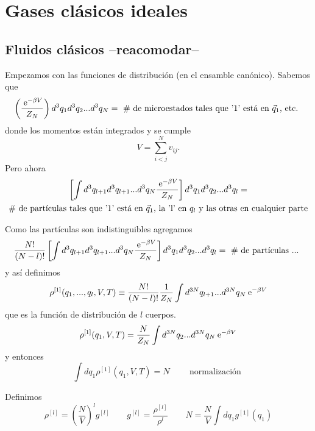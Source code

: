 \documentclass[10pt,oneside]{CBFT_book}
\begin{document}
\chapter{Gases clásicos ideales}


\section{Fluidos clásicos --reacomodar--}

Empezamos con las funciones de distribución (en el ensamble canónico). Sabemos que
\[
	\left( \frac{\:\mathrm{e}^{-\beta V}}{Z_N} \right)d^3q_1 d^3q_2 ... d^3q_N = 
	\text{ \# de microestados tales que '1' está en $\vec{q}_1$, etc. }
\]
donde los momentos están integrados y se cumple 
\[
	V = \sum_{i<j}^N v_{ij}.
\]
Pero ahora 
\begin{multline*}
	\left[ \int d^3q_{l+1} d^3q_{l+1} ... d^3q_{N} \frac{\:\mathrm{e}^{-\beta V}}{Z_N} \right] d^3q_1 d^3q_2 ... d^3q_l 
	=\\
	\text{ \# de partículas tales que '1' está en $\vec{q}_1$, la 'l' en $q_l$ y las otras en cualquier parte } 
\end{multline*}

Como las partículas son indistinguibles agregamos 
\[
	\frac{N!}{(N-l)!} \left[ \int d^3q_{l+1} d^3q_{l+1} ... d^3q_{N} \frac{\:\mathrm{e}^{-\beta V}}{Z_N} \right] 
	d^3q_1 d^3q_2 ... d^3q_l = \text{ \# de partículas ... } 
\]
y así definimos
\[
	\rho^{[1]}( q_1,...,q_l, V, T ) \equiv \frac{N!}{(N-l)!} \frac{1}{Z_N} \int d^{3N}q_{l+1} ...  d^{3N}q_N 
	\:\mathrm{e}^{-\beta V}
\]
que es la función de distribución de $l$ cuerpos.
\[
	\rho^{[1]}( q_1, V, T ) = \frac{N}{Z_N} \int d^{3N}q_2 ...  d^{3N}q_N \:\mathrm{e}^{-\beta V}
\]
y entonces
\[
	\int dq_1 \rho^{[1]}( q_1, V, T ) = N \qquad \text{ normalización }
\]

Definimos 
\[
	\rho^{[l]} = \left( \frac{N}{V} \right)^l g^{[l]} \qquad g^{[l]} = \frac{\rho^{[l]}}{\rho^l} 
	\qquad N = \frac{N}{V} \int dq_1 g^{[1]}( q_1 )
\]
\end{document}

